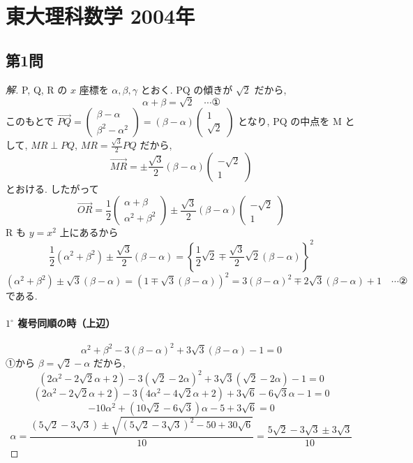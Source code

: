 \documentclass[../main.tex]{subfiles}
\begin{document}
\section*{東大理科数学 2004年}

\subsection*{第1問}

\begin{proof}[解]
  P, Q, R の $x$ 座標を $\alpha, \beta, \gamma$ とおく. PQ の傾きが $\sqrt{2}$ だから,
  \begin{equation}
    \alpha + \beta = \sqrt{2} \quad \cdots ①
  \end{equation}
  このもとで $\vec{PQ} =
  \begin{pmatrix} \beta - \alpha \\ \beta^2 - \alpha^2
  \end{pmatrix} = (\beta - \alpha)
  \begin{pmatrix} 1 \\ \sqrt{2}
  \end{pmatrix}$ となり, PQ の中点を M として, $MR \perp PQ$, $MR = \frac{\sqrt{3}}{2} PQ$ だから,
  \[
    \vec{MR} = \pm \frac{\sqrt{3}}{2} (\beta - \alpha)
    \begin{pmatrix} -\sqrt{2} \\ 1
    \end{pmatrix}
  \]
  とおける. したがって
  \[
    \vec{OR} = \frac{1}{2}
    \begin{pmatrix} \alpha + \beta \\ \alpha^2 + \beta^2
    \end{pmatrix} \pm \frac{\sqrt{3}}{2} (\beta - \alpha)
    \begin{pmatrix} -\sqrt{2} \\ 1
    \end{pmatrix}
  \]
  R も $y = x^2$ 上にあるから
  \[
    \frac{1}{2} (\alpha^2 + \beta^2) \pm \frac{\sqrt{3}}{2} (\beta - \alpha) = \left\{ \frac{1}{2} \sqrt{2} \mp \frac{\sqrt{3}}{2} \sqrt{2} (\beta - \alpha) \right\}^2
  \]
  \[
    (\alpha^2 + \beta^2) \pm \sqrt{3}(\beta - \alpha) = (1 \mp \sqrt{3}(\beta - \alpha))^2 = 3(\beta - \alpha)^2 \mp 2\sqrt{3}(\beta - \alpha) + 1 \quad \cdots ②
  \]
  である.

  \paragraph{$1^\circ$ 複号同順の時（上辺）}
  \[
    \alpha^2 + \beta^2 - 3(\beta - \alpha)^2 + 3\sqrt{3}(\beta - \alpha) - 1 = 0
  \]
  ①から $\beta = \sqrt{2} - \alpha$ だから,
  \[
    (2\alpha^2 - 2\sqrt{2}\alpha + 2) - 3(\sqrt{2} - 2\alpha)^2 + 3\sqrt{3}(\sqrt{2} - 2\alpha) - 1 = 0
  \]
  \[
    (2\alpha^2 - 2\sqrt{2}\alpha + 2) - 3(4\alpha^2 - 4\sqrt{2}\alpha + 2) + 3\sqrt{6} - 6\sqrt{3}\alpha - 1 = 0
  \]
  \[
    -10\alpha^2 + (10\sqrt{2} - 6\sqrt{3})\alpha - 5 + 3\sqrt{6} = 0
  \]
  \[
    \alpha = \frac{(5\sqrt{2} - 3\sqrt{3}) \pm \sqrt{(5\sqrt{2} - 3\sqrt{3})^2 - 50 + 30\sqrt{6}}}{10} = \frac{5\sqrt{2} - 3\sqrt{3} \pm 3\sqrt{3}}{10}
  \]


\end{proof}
\end{document}
